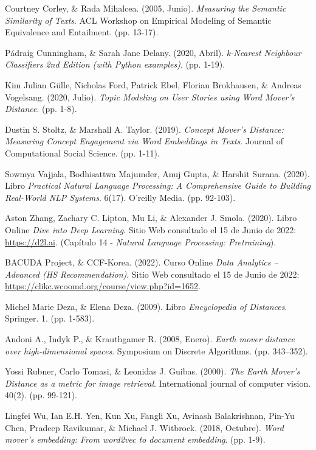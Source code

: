 \documentclass[12pt,a4paper]{article}
\begin{document}
\begin{sloppypar}
\begin{thebibliography}{9}
Courtney Corley, \& Rada Mihalcea. (2005, Junio). \textit{Measuring the Semantic Similarity of Texts}. ACL Workshop on Empirical Modeling of Semantic Equivalence and Entailment. (pp. 13-17).

Pádraig Cunningham, \& Sarah Jane Delany. (2020, Abril). \textit{k-Nearest Neighbour Classifiers 2nd Edition (with Python examples)}. (pp. 1-19).

Kim Julian Gülle, Nicholas Ford, Patrick Ebel, Florian Brokhausen,  \& Andreas Vogelsang. (2020, Julio). \textit{Topic Modeling on User Stories using Word Mover’s Distance}. (pp. 1-8).

Dustin S. Stoltz, \& Marshall A. Taylor. (2019). \textit{Concept Mover’s Distance: Measuring Concept Engagement via Word Embeddings in Texts}. Journal of Computational Social Science. (pp. 1-11).

Sowmya Vajjala, Bodhisattwa Majumder, Anuj Gupta, \& Harshit Surana. (2020). Libro \textit{Practical Natural Language Processing: A Comprehensive Guide to Building Real-World NLP Systems}. 6(17). O'reilly Media. (pp. 92-103).

Aston Zhang, Zachary C. Lipton, Mu Li, \& Alexander J. Smola. (2020). Libro Online \textit{Dive into Deep Learning}. Sitio Web consultado el 15 de Junio de 2022: \url{https://d2l.ai}. (Capítulo 14 - \textit{Natural Language Processing: Pretraining}).

BACUDA Project, \& CCF-Korea. (2022). Curso Online \textit{Data Analytics – Advanced (HS Recommendation)}. Sitio Web consultado el 15 de Junio de 2022: \url{https://clikc.wcoomd.org/course/view.php?id=1652}.

Michel Marie Deza, \& Elena Deza. (2009). Libro \textit{Encyclopedia of Distances}. Springer. 1. (pp. 1-583).

Andoni A., Indyk P., \& Krauthgamer R. (2008, Enero). \textit{Earth mover distance over high-dimensional spaces}. Symposium on Discrete Algorithms. (pp. 343–352).

Yossi Rubner, Carlo Tomasi, \& Leonidas J. Guibas. (2000). \textit{The Earth Mover’s Distance as a metric for image retrieval}. International journal of computer vision. 40(2). (pp. 99-121).

Lingfei Wu, Ian E.H. Yen, Kun Xu, Fangli Xu, Avinash Balakrishnan, Pin-Yu Chen, Pradeep Ravikumar, \& Michael J. Witbrock. (2018, Octubre). \textit{Word mover’s embedding: From word2vec to document embedding}. (pp. 1-9).

\end{thebibliography}

\end{sloppypar}
\end{document}
